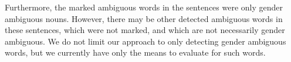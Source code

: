 Furthermore, the marked ambiguous words in the sentences were only gender ambiguous nouns. However, there may be other detected ambiguous words in these sentences, which were not marked, and which are not necessarily gender ambiguous. We do not limit our approach to only detecting gender ambiguous words, but we currently have only the means to evaluate for such words.



